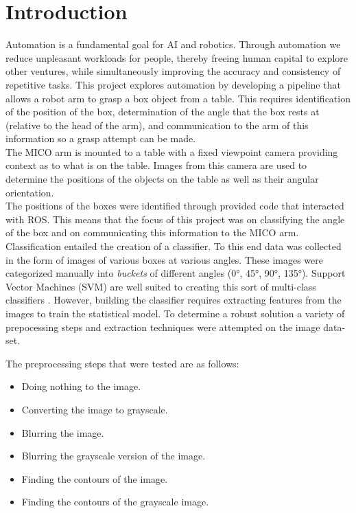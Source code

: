 \documentclass[letterpaper, 10 pt, conference]{conf/ieeeconf}  %
\begin{document}
\section{Introduction}

Automation is a fundamental goal for AI and robotics. Through automation we
reduce unpleasant workloads for people, thereby freeing human capital to explore
other ventures, while simultaneously improving the accuracy and consistency of
repetitive tasks. This project explores automation by developing a pipeline that
allows a robot arm to grasp a box object from a table. This requires
identification of the position of the box, determination of the angle that the
box rests at (relative to the head of the arm), and communication to the arm of
this information so a grasp attempt can be made.\\

The MICO arm is mounted to a table with a fixed viewpoint camera providing
context as to what is on the table. Images from this camera are used to
determine the positions of the objects on the table as well as their angular
orientation.\\

The positions of the boxes were identified through provided code that interacted
with ROS. This means that the focus of this project was on classifying the angle
of the box and on communicating this information to the MICO arm. Classification
entailed the creation of a classifier. To this end data was collected in the
form of images of various boxes at various angles. These images were categorized
manually into \textit{buckets} of different angles (\ang{0}, \ang{45}, \ang{90},
\ang{135}). Support Vector Machines (SVM) are well suited to creating this sort
of multi-class classifiers \cite{Hsu2015}. However, building the classifier
requires extracting features from the images to train the statistical model. To
determine a robust solution a variety of prepocessing steps and extraction
techniques were attempted on the image data-set.

The preprocessing steps that were tested are as follows:
\begin{itemize}
\item Doing nothing to the image.
\item Converting the image to grayscale.
\item Blurring the image.
\item Blurring the grayscale version of the image.
\item Finding the contours of the image.
\item Finding the contours of the grayscale image.
\end{itemize}
\end{document}

